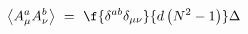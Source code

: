 \begin{equation}\label{4}
\left\langle A_{\mu}^{a}A_{\nu}^{b}\right\rangle ~=~
\f{\delta^{ab}\delta_{\mu\nu}} {d\left(N^{2}-1\right)}\Delta
\end{equation}


